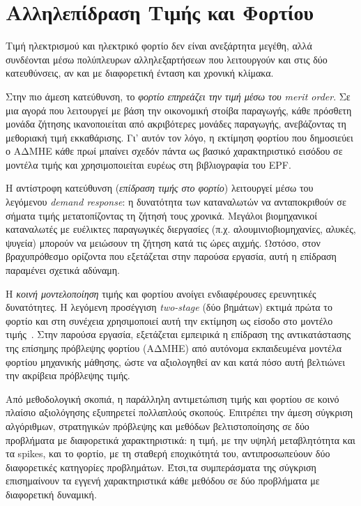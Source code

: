 \section{Αλληλεπίδραση Τιμής και Φορτίου}
\label{sec:price_load_interaction}

Τιμή ηλεκτρισμού και ηλεκτρικό φορτίο δεν είναι ανεξάρτητα μεγέθη, αλλά
συνδέονται μέσω πολύπλευρων αλληλεξαρτήσεων που λειτουργούν και στις δύο κατευθύνσεις,
αν και με διαφορετική ένταση και χρονική κλίμακα.

Στην πιο άμεση κατεύθυνση, το \textit{φορτίο επηρεάζει την τιμή μέσω του merit order}.
Σε μια αγορά που λειτουργεί με βάση την οικονομική στοίβα παραγωγής, κάθε πρόσθετη
μονάδα ζήτησης ικανοποιείται από ακριβότερες μονάδες παραγωγής, ανεβάζοντας τη
μεθοριακή τιμή εκκαθάρισης. Γι' αυτόν τον λόγο, η εκτίμηση φορτίου που δημοσιεύει
ο ΑΔΜΗΕ κάθε πρωί μπαίνει σχεδόν πάντα ως βασικό χαρακτηριστικό εισόδου σε μοντέλα
τιμής και χρησιμοποιείται ευρέως στη βιβλιογραφία του EPF.

Η αντίστροφη κατεύθυνση (\textit{επίδραση τιμής στο φορτίο}) λειτουργεί μέσω
του λεγόμενου \textit{demand response}: η δυνατότητα των καταναλωτών να ανταποκριθούν
σε σήματα τιμής μετατοπίζοντας τη ζήτησή τους χρονικά. Μεγάλοι βιομηχανικοί
καταναλωτές με ευέλικτες παραγωγικές διεργασίες (π.χ. αλουμινιοβιομηχανίες, αλυκές,
ψυγεία) μπορούν να μειώσουν τη ζήτηση κατά τις ώρες αιχμής. Ωστόσο, στον
βραχυπρόθεσμο ορίζοντα που εξετάζεται στην παρούσα εργασία, αυτή η επίδραση
παραμένει σχετικά αδύναμη.

Η \textit{κοινή μοντελοποίηση} τιμής και φορτίου ανοίγει ενδιαφέρουσες ερευνητικές
δυνατότητες. Η λεγόμενη προσέγγιση \textit{two-stage} (δύο βημάτων) εκτιμά πρώτα το
φορτίο και στη συνέχεια χρησιμοποιεί αυτή την εκτίμηση ως είσοδο στο μοντέλο
τιμής~\cite{lago2021}. Στην παρούσα εργασία, εξετάζεται εμπειρικά η επίδραση της
αντικατάστασης της επίσημης πρόβλεψης φορτίου (ΑΔΜΗΕ) από αυτόνομα εκπαιδευμένα
μοντέλα φορτίου μηχανικής μάθησης, ώστε να αξιολογηθεί αν και κατά πόσο αυτή
βελτιώνει την ακρίβεια πρόβλεψης τιμής.

Από μεθοδολογική σκοπιά, η παράλληλη αντιμετώπιση τιμής και φορτίου σε κοινό
πλαίσιο αξιολόγησης εξυπηρετεί πολλαπλούς σκοπούς. Επιτρέπει την άμεση σύγκριση
αλγόριθμων, στρατηγικών πρόβλεψης και μεθόδων βελτιστοποίησης σε δύο προβλήματα
με διαφορετικά χαρακτηριστικά: η τιμή, με την υψηλή μεταβλητότητα και τα spikes,
και το φορτίο, με τη σταθερή εποχικότητά του, αντιπροσωπεύουν δύο διαφορετικές
κατηγορίες προβλημάτων. Έτσι,τα συμπεράσματα της σύγκριση επισημαίνουν τα εγγενή
χαρακτηριστικά κάθε μεθόδου σε δύο προβλήματα με διαφορετική δυναμική.

